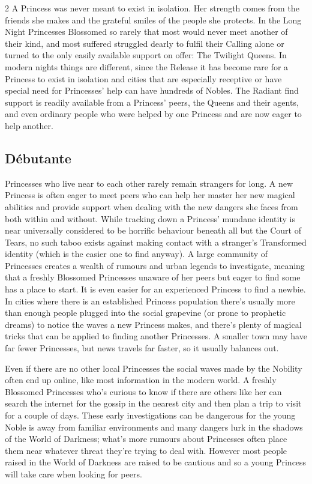 \begin{multicols}{2}
A Princess was never meant to exist in isolation. Her strength comes from the friends she makes and the grateful smiles of the people she protects. In the Long Night Princesses Blossomed so rarely that most would never meet another of their kind, and most suffered struggled dearly to fulfil their Calling alone or turned to the only easily available support on offer: The Twilight Queens. In modern nights things are different, since the Release it has become rare for a Princess to exist in isolation and cities that are especially receptive or have special need for Princesses' help can have hundreds of Nobles. The Radiant find support is readily available from a Princess' peers, the Queens and their agents, and even ordinary people who were helped by one Princess and are now eager to help another.

\subsection*{D\'ebutante} 

Princesses who live near to each other rarely remain strangers for long. A new Princess is often eager to meet peers who can help her master her new magical abilities and provide support when dealing with the new dangers she faces from both within and without. While tracking down a Princess' mundane identity is near universally considered to be horrific behaviour beneath all but the Court of Tears, no such taboo exists against making contact with a stranger's Transformed identity (which is the easier one to find anyway). A large community of Princesses creates a wealth of rumours and urban legends to investigate, meaning that a freshly Blossomed Princesses unaware of her peers but eager to find some has a place to start. It is even easier for an experienced Princess to find a newbie. In cities where there is an established Princess population there's usually more than enough people plugged into the social grapevine (or prone to prophetic dreams) to notice the waves a new Princess makes, and there's plenty of magical tricks that can be applied to finding another Princesses. A smaller town may have far fewer Princesses, but news travels far faster, so it usually balances out.  

Even if there are no other local Princesses the social waves made by the Nobility often end up online, like most information in the modern world. A freshly Blossomed Princesses who's curious to know if there are others like her can search the internet for the gossip in the nearest city and then plan a trip to visit for a couple of days. These early investigations can be dangerous for the young Noble is away from familiar environments and many dangers lurk in the shadows of the World of Darkness; what's more rumours about Princesses often place them near whatever threat they're trying to deal with. However most people raised in the World of Darkness are raised to be cautious and so a young Princess will take care when looking for peers. 


\end{multicols}
